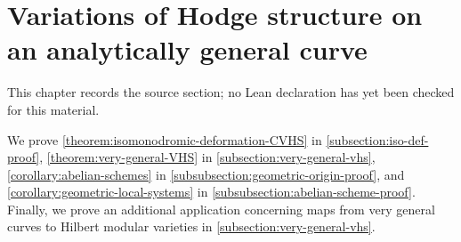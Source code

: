 \chapter{Variations of Hodge structure on an analytically general curve}
\label{geometric-local-systems-general-curves-isomonodromy-chapter-07}

\begin{remark}
\label{geometric-local-systems-general-curves-isomonodromy-chapter-07-source}
This chapter records the source section; no Lean declaration has yet been checked for this material.
\notready
\end{remark}

\label{section:hodge-theoretic-results}
We prove \autoref{theorem:isomonodromic-deformation-CVHS} in
\autoref{subsection:iso-def-proof},
\autoref{theorem:very-general-VHS} in \autoref{subsection:very-general-vhs},
\autoref{corollary:abelian-schemes} in
\autoref{subsubsection:geometric-origin-proof},
and
\autoref{corollary:geometric-local-systems} in
\autoref{subsubsection:abelian-scheme-proof}.
Finally, we prove an additional application concerning maps from very general
curves to Hilbert modular varieties in \autoref{subsection:very-general-vhs}.



